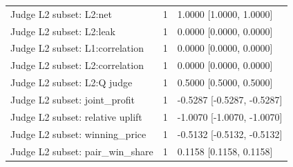 \begin{longtable}{@{}p{3.2in}rp{2.1in}@{}}
Judge L2 subset: L2:net & 1 & 1.0000 [1.0000, 1.0000]\\
Judge L2 subset: L2:leak & 1 & 0.0000 [0.0000, 0.0000]\\
Judge L2 subset: L1:correlation & 1 & 0.0000 [0.0000, 0.0000]\\
Judge L2 subset: L2:correlation & 1 & 0.0000 [0.0000, 0.0000]\\
Judge L2 subset: L2:Q judge & 1 & 0.5000 [0.5000, 0.5000]\\
Judge L2 subset: joint\_\allowbreak profit & 1 & -0.5287 [-0.5287, -0.5287]\\
Judge L2 subset: relative uplift & 1 & -1.0070 [-1.0070, -1.0070]\\
Judge L2 subset: winning\_\allowbreak price & 1 & -0.5132 [-0.5132, -0.5132]\\
Judge L2 subset: pair\_\allowbreak win\_\allowbreak share & 1 & 0.1158 [0.1158, 0.1158]\\
\end{longtable}\endgroup
